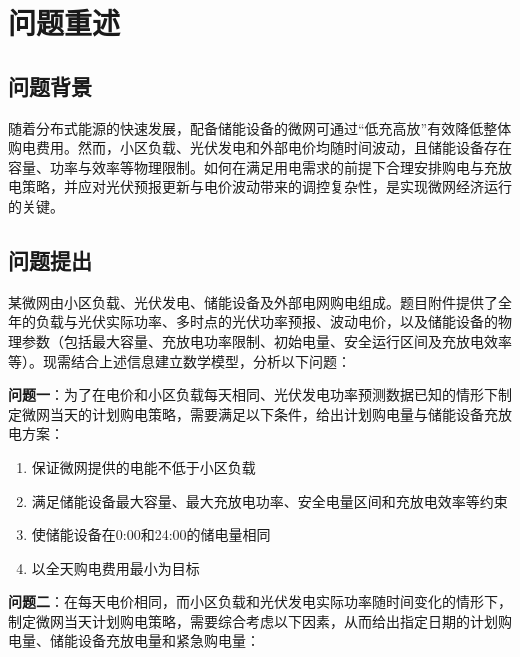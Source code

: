 \documentclass[withoutpreface,bwprint]{cumcmthesis}
\begin{document}

\section{问题重述}
\subsection{问题背景}
\vspace{-5pt}
随着分布式能源的快速发展，配备储能设备的微网可通过“低充高放”有效降低整体购电费用。然而，小区负载、光伏发电和外部电价均随时间波动，且储能设备存在容量、功率与效率等物理限制。如何在满足用电需求的前提下合理安排购电与充放电策略，并应对光伏预报更新与电价波动带来的调控复杂性，是实现微网经济运行的关键。

\vspace{-13pt}
\subsection{问题提出}

某微网由小区负载、光伏发电、储能设备及外部电网购电组成。题目附件提供了全年的负载与光伏实际功率、多时点的光伏功率预报、波动电价，以及储能设备的物理参数（包括最大容量、充放电功率限制、初始电量、安全运行区间及充放电效率等）。现需结合上述信息建立数学模型，分析以下问题：

\textbf{问题一}：为了在电价和小区负载每天相同、光伏发电功率预测数据已知的情形下制定微网当天的计划购电策略，需要满足以下条件，给出计划购电量与储能设备充放电方案：

\begin{enumerate}[label=\arabic*.,leftmargin=40pt]
	
	\item 保证微网提供的电能不低于小区负载
	\item 满足储能设备最大容量、最大充放电功率、安全电量区间和充放电效率等约束
	\item 使储能设备在0:00和24:00的储电量相同
	\item 以全天购电费用最小为目标
	
\end{enumerate}

\textbf{问题二}：在每天电价相同，而小区负载和光伏发电实际功率随时间变化的情形下，制定微网当天计划购电策略，需要综合考虑以下因素，从而给出指定日期的计划购电量、储能设备充放电量和紧急购电量：
\end{document}
